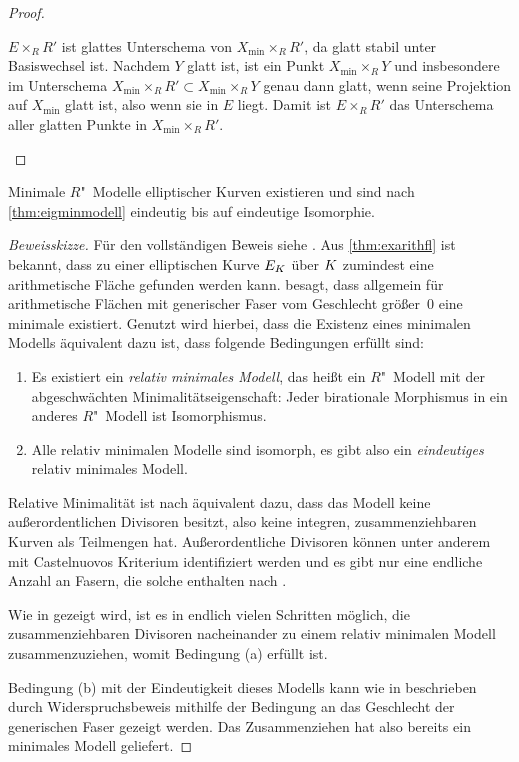 \begin{Satz}
\begin{proof}
\begin{enumerate}[resume*,start=1]
      $E\times_R R'$ ist glattes Unterschema von
      ${X_{\text{min}}\times_R R'}$, da glatt stabil unter Basiswechsel
      ist. Nachdem $Y$ glatt ist, ist ein Punkt 
      ${X_{\text{min}}\times_R Y}$ und insbesondere im Unterschema
      ${X_{\text{min}}\times_R R'\subset X_{\text{min}}\times_R Y}$
      genau dann glatt, wenn seine Projektion auf $X_{\text{min}}$
      glatt ist, also wenn sie in $E$ liegt. Damit ist ${E\times_R R'}$
      das Unterschema aller glatten Punkte in
      ${X_{\text{min}}\times_R R'}$.
      \qedhere
    \end{enumerate}
  \end{proof}
\end{Satz}

\begin{Satz}\label{thm:exminmodell}
  Minimale $R$"~Modelle elliptischer Kurven existieren und sind nach
  \ref{thm:eigminmodell} eindeutig bis auf eindeutige Isomorphie.
  \begin{proof}[Beweisskizze]
    Für den vollständigen Beweis siehe \cite[Theorem~9.3.21]{liu}.
    Aus \ref{thm:exarithfl} ist bekannt, dass zu einer elliptischen
    Kurve $E_{K}$ über $K$ zumindest eine arithmetische Fläche
    gefunden werden kann.
    \cite[Theorem~9.3.21]{liu} besagt, dass allgemein für
    arithmetische Flächen mit generischer Faser vom Geschlecht
    größer~0 eine minimale existiert.
    Genutzt wird hierbei, dass die Existenz eines minimalen Modells
    äquivalent dazu ist, dass folgende Bedingungen erfüllt sind:
    \begin{enumerate}[label=(\alph*)]
    \item Es existiert ein \emph{relativ minimales Modell}, das heißt
      ein $R$"~Modell mit der abgeschwächten Minimalitätseigenschaft:
      Jeder birationale Morphismus in ein anderes $R$"~Modell ist
      Isomorphismus.
    \item Alle relativ minimalen Modelle sind isomorph, es gibt also
      ein \emph{eindeutiges} relativ minimales Modell.
    \end{enumerate}
    Relative Minimalität ist nach \cite[Theorem~9.2.2]{liu} äquivalent
    dazu, dass das Modell keine außerordentlichen Divisoren besitzt,
    also keine integren, zusammenziehbaren Kurven als Teilmengen
    hat.
    Außerordentliche Divisoren können unter anderem mit Castelnuovos
    Kriterium \cite[Theorem~9.3.8]{liu} identifiziert werden und es
    gibt nur eine endliche Anzahl an Fasern, die solche enthalten nach
    \cite[Lemma~9.3.17]{liu}.

    Wie in \cite[Proposition~9.3.19]{liu} gezeigt wird, ist es in
    endlich vielen Schritten möglich, die zusammenziehbaren Divisoren
    nacheinander zu einem relativ minimalen Modell zusammenzuziehen,
    womit Bedingung (a) erfüllt ist.

    Bedingung (b) mit der Eindeutigkeit dieses Modells kann wie in
    \cite[Theorem~9.3.21]{liu} beschrieben durch Widerspruchsbeweis
    mithilfe der Bedingung an das Geschlecht der generischen Faser
    gezeigt werden.
    Das Zusammenziehen hat also bereits ein minimales Modell geliefert.
  \end{proof}
\end{Satz}

